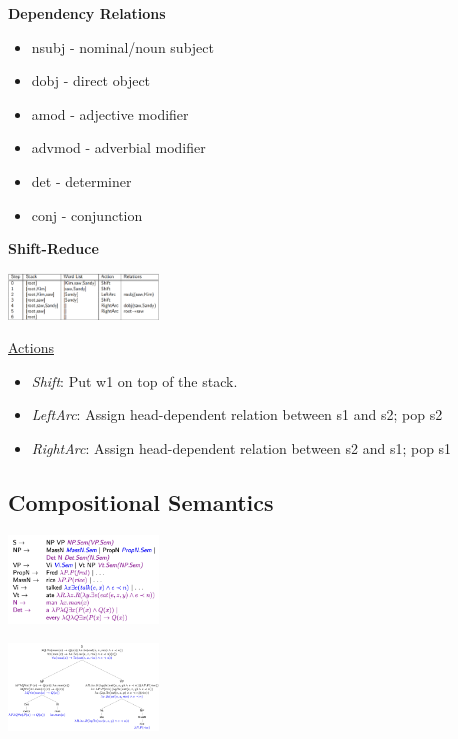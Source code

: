 \documentclass[8pt]{extarticle} %
\begin{document}
\begin{multicols*}{3}
\textbf{Dependency Relations}
\begin{itemize}[label=\textbullet, labelsep=0.3em, leftmargin=0.5em, itemsep=0em]
\item nsubj - nominal/noun subject
\item dobj - direct object
\item amod - adjective modifier
\item advmod - adverbial modifier
\item det - determiner
\item conj - conjunction
\end{itemize}
\textbf{Shift-Reduce}
\begin{center}
    \includegraphics[width=0.3\textwidth]{media/shift-reduce.png}
\end{center}
\underline{Actions}
\begin{itemize}[label=\textbullet, labelsep=0.3em, leftmargin=0.5em, itemsep=0em]
    \item \textit{Shift}: Put w1 on top of the stack.
    \item \textit{LeftArc}: Assign head-dependent relation between s1 and s2; pop s2
    \item \textit{RightArc}: Assign head-dependent relation between s2 and s1; pop s1
\end{itemize}

\subsection*{Compositional Semantics}
\begin{center}
    \includegraphics[width=0.3\textwidth]{media/semantic-grammar.png}
\end{center}
\begin{center}
    \includegraphics[width=0.3\textwidth]{media/semantic-tree.png}
\end{center}


\end{multicols*}
\end{document}
